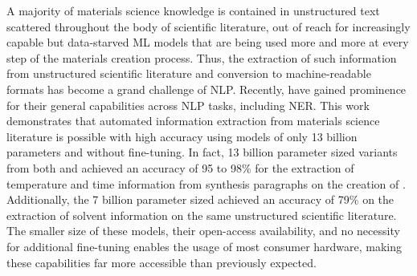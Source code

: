 \label{chap:abstract}

A majority of materials science knowledge is contained in unstructured text scattered throughout the body of scientific literature, out of reach for increasingly capable but data-starved \acrlong{ML} models that are being used more and more at every step of the materials creation process.
Thus, the extraction of such information from unstructured scientific literature and conversion to machine-readable formats has become a grand challenge of \acrlong{NLP}.
Recently,  have gained prominence for their general capabilities across \acrlong{NLP} tasks, including \acrlong{NER}.
This work demonstrates that automated information extraction from materials science literature is possible with high accuracy using models of only 13 billion parameters and without fine-tuning.
In fact, 13 billion parameter sized variants from both  and  achieved an accuracy of 95 to 98\% for the extraction of temperature and time information from synthesis paragraphs on the creation of .
Additionally, the 7 billion parameter sized  achieved an accuracy of 79\% on the extraction of solvent information on the same unstructured scientific literature.
The smaller size of these models, their open-access availability, and no necessity for additional fine-tuning enables the usage of most consumer hardware, making these capabilities far more accessible than previously expected.

